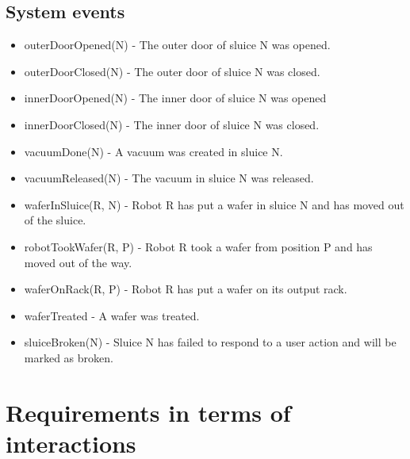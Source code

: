 \documentclass[12pt]{report}
\begin{document}
	\section{System events}
	\begin{itemize}
\item outerDoorOpened(N) - The outer door of sluice N was opened.
\item outerDoorClosed(N) - The outer door of sluice N was closed.
\item innerDoorOpened(N) - The inner door of sluice N was opened
\item innerDoorClosed(N) - The inner door of sluice N was closed. 
\item vacuumDone(N) - A vacuum was created in sluice N.
\item vacuumReleased(N) - The vacuum in sluice N was released.
\item waferInSluice(R, N) - Robot R has put a wafer in sluice N and has moved out of the sluice.
\item robotTookWafer(R, P) - Robot R took a wafer from position P and has moved out of the way.
\item waferOnRack(R, P) - Robot R has put a wafer on its output rack.
\item waferTreated - A wafer was treated.
\item sluiceBroken(N) - Sluice N has failed to respond to a user action and will be marked as broken.
	\end{itemize}
	
	\chapter{Requirements in terms of interactions}
\end{document}

